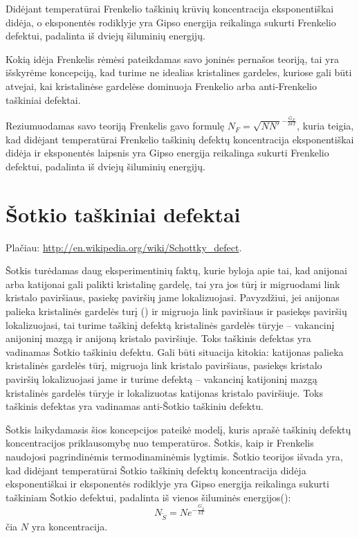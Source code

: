 Didėjant temperatūrai Frenkelio taškinių krūvių koncentracija eksponentiškai
didėja, o eksponentės rodiklyje yra Gipso energija reikalinga sukurti
Frenkelio defektui, padalinta iš dviejų šiluminių energijų.

\begin{remember}
  \item Kokią idėja Frenkelis rėmėsi pateikdamas savo joninės pernašos
    teoriją, tai yra išskyrėme koncepciją, kad turime ne idealias
    kristalines gardeles, kuriose gali būti atvejai, kai kristalinėse
    gardelėse dominuoja Frenkelio arba anti-Frenkelio taškiniai defektai.
  \item Reziumuodamas savo teoriją Frenkelis gavo formulę
    $N_{F} = \sqrt{NN'}^{-\frac{G_F}{2kT}}$, kuria teigia, kad didėjant
    temperatūrai Frenkelio taškinių defektų koncentracija
    eksponentiškai didėja ir eksponentės laipsnis yra Gipso energija
    reikalinga sukurti Frenkelio defektui, padalinta iš dviejų
    šiluminių energijų.
\end{remember}

\section{Šotkio taškiniai defektai}

Plačiau: \url{http://en.wikipedia.org/wiki/Schottky_defect}.

Šotkis turėdamas daug eksperimentinių faktų, kurie byloja apie tai, kad
anijonai arba katijonai gali palikti kristalinę gardelę, tai yra
jos tūrį ir migruodami link kristalo paviršiaus, pasiekę
paviršių jame lokalizuojasi. Pavyzdžiui, jei anijonas palieka kristalinės
gardelės turį () ir migruoja link paviršiaus ir pasiekęs
paviršių lokalizuojasi, tai turime taškinį defektą kristalinės
gardelės tūryje – vakancinį anijoninį mazgą ir anijoną kristalo
paviršiuje. Toks taškinis defektas yra vadinamas Šotkio taškiniu
defektu. Gali būti situacija kitokia: katijonas palieka kristalinės
gardelės tūrį, migruoja link kristalo paviršiaus, pasiekęs kristalo
paviršių lokalizuojasi jame ir turime defektą – vakancinį katijoninį
mazgą kristalinės gardelės tūryje ir lokalizuotas katijonas kristalo
paviršiuje. Toks taškinis defektas yra vadinamas anti-Šotkio taškiniu
defektu.

Šotkis laikydamasis šios koncepcijos pateikė modelį, kuris aprašė
taškinių defektų koncentracijos priklausomybę nuo temperatūros.
Šotkis, kaip ir Frenkelis naudojosi pagrindinėmis termodinaminėmis
lygtimis. Šotkio teorijos išvada yra, kad didėjant temperatūrai
Šotkio taškinių defektų koncentracija didėja eksponentiškai ir
eksponentės rodiklyje yra Gipso energija reikalinga sukurti
taškiniam Šotkio defektui, padalinta iš vienos šiluminės
energijos():
\begin{equation*}
  N_{\check{S}} = N e^{-\frac{G_{\check{S}}}{kT}}
\end{equation*}
čia $N$ yra koncentracija.

